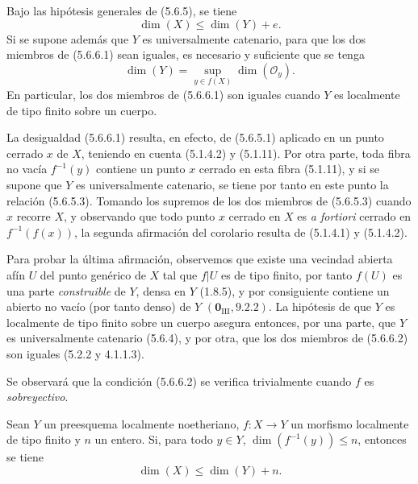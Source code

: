 \begin{corollary}[5.6.6]
\label{IV.2.s5.6.6-fr}
Bajo las hipótesis generales de \textup{(5.6.5)}, se tiene
\begin{equation}
\dim(X)\leq\dim(Y)+e.
\tag{5.6.6.1}\label{IV.2.s5.6.6.1-fr}
\end{equation}
Si se supone además que $Y$ es universalmente catenario, para que los dos
miembros de \textup{(5.6.6.1)} sean iguales, es necesario y suficiente que se tenga
\begin{equation}
\dim(Y)=\sup_{y\in f(X)}\dim(\mathcal O_y).
\tag{5.6.6.2}\label{IV.2.s5.6.6.2-fr}
\end{equation}
En particular, los dos miembros de \textup{(5.6.6.1)} son iguales cuando $Y$ es
localmente de tipo finito sobre un cuerpo.
\end{corollary}

La desigualdad (5.6.6.1) resulta, en efecto, de (5.6.5.1) aplicado en un punto
cerrado $x$ de $X$, teniendo en cuenta (5.1.4.2) y (5.1.11). Por otra parte,
toda fibra no vacía $f^{-1}(y)$ contiene un punto $x$ cerrado en esta
fibra (5.1.11), y si se supone que $Y$ es universalmente catenario, se tiene
por tanto en este punto la relación (5.6.5.3). Tomando los supremos de los dos
miembros de (5.6.5.3) cuando $x$ recorre $X$, y observando que todo punto
$x$ cerrado en $X$ es \emph{a fortiori} cerrado en $f^{-1}(f(x))$, la
segunda afirmación del corolario resulta de (5.1.4.1) y (5.1.4.2).

Para probar la última afirmación, observemos que existe una vecindad abierta
afín $U$ del punto genérico de $X$ tal que $f|U$ es de tipo finito, por tanto
$f(U)$ es una parte \emph{construible} de $Y$, densa en $Y$ (1.8.5), y por
consiguiente contiene un abierto no vacío (por tanto denso) de $Y$
$(\mathbf{0}_{\mathrm{III}},9.2.2)$. La hipótesis de que $Y$ es localmente de tipo
finito sobre un cuerpo asegura entonces, por una parte, que $Y$ es
universalmente catenario (5.6.4), y por otra, que los dos miembros de (5.6.6.2)
son iguales (5.2.2 y 4.1.1.3).

Se observará que la condición (5.6.6.2) se verifica trivialmente cuando $f$
es \emph{sobreyectivo}.

\begin{corollary}[5.6.7]
\label{IV.2.s5.6.7-fr}
Sean $Y$ un preesquema localmente noetheriano, $f:X\to Y$ un morfismo
localmente de tipo finito y $n$ un entero. Si, para todo $y\in Y$,
$\dim(f^{-1}(y))\leq n$, entonces se tiene
\begin{equation}
\dim(X)\leq\dim(Y)+n.
\tag{5.6.7.1}\label{IV.2.s5.6.7.1-fr}
\end{equation}
\end{corollary}

